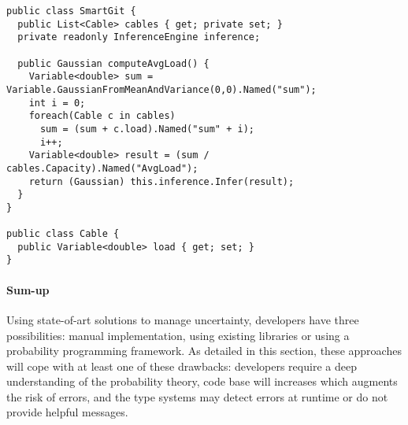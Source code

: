 \begin{lstlisting}[style=cSharpStyle, caption=Limitation using a probability programing framework (C\#), label=lst:limit-proba-prog-fw, linewidth=0.97\textwidth]
public class SmartGit {
  public List<Cable> cables { get; private set; }
  private readonly InferenceEngine inference;

  public Gaussian computeAvgLoad() {
    Variable<double> sum = Variable.GaussianFromMeanAndVariance(0,0).Named("sum");
    int i = 0;
    foreach(Cable c in cables)
      sum = (sum + c.load).Named("sum" + i);
      i++;
    Variable<double> result = (sum / cables.Capacity).Named("AvgLoad");
    return (Gaussian) this.inference.Infer(result);
  }
}

public class Cable {
  public Variable<double> load { get; set; }
}
\end{lstlisting}

\paragraph{Sum-up}
Using state-of-art solutions to manage uncertainty, developers have three possibilities: manual implementation, using existing libraries or using a probability programming framework.
As detailed in this section, these approaches will cope with at least one of these drawbacks: developers require a deep understanding of the probability theory, code base will increases which augments the risk of errors, and the type systems may detect errors at runtime or do not provide helpful messages.
